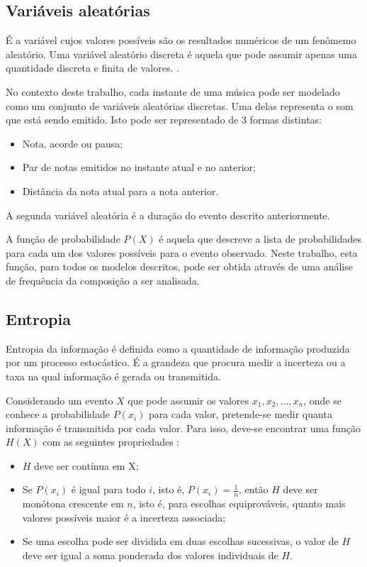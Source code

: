 \subsection{Variáveis aleatórias}
\label{sec:prob}

É a variável cujos valores possíveis são os resultados numéricos de um fenômemo aleatório. Uma variável aleatório discreta é aquela que pode assumir apenas uma quantidade discreta e finita de valores. \cite{estocastico}.

No contexto deste trabalho, cada instante de uma música pode ser modelado como um conjunto de variáveis aleatórias discretas. Uma delas representa o som que está sendo emitido. Isto pode ser representado de 3 formas distintas:

\begin{itemize}
    \item Nota, acorde ou pausa;
    \item Par de notas emitidos no instante atual e no anterior;
    \item Distância da nota atual para a nota anterior.
\end{itemize}

A segunda variável aleatória é a duração do evento descrito anteriormente.

A função de probabilidade $P(X)$ é aquela que descreve a lista de probabilidades para cada um dos valores possíveis para o evento observado. Neste trabalho, esta função, para todos os modelos descritos, pode ser obtida através de uma análise de frequência da composição a ser analisada.

\subsection{Entropia}

Entropia da informação é definida como a quantidade de informação produzida por um processo estocástico. É a grandeza que procura medir a incerteza ou a taxa na qual informação é gerada ou transmitida.

Considerando um evento $X$ que pode assumir os valores ${x_1, x_2, ..., x_n}$, onde se conhece a probabilidade $P(x_i)$ para cada valor, pretende-se medir quanta informação é transmitida por cada valor. Para isso, deve-se encontrar uma função $H(X)$ com as seguintes propriedades \cite{shannon}:

\begin{itemize}
    \item $H$ deve ser contínua em X;
    \item Se $P(x_i)$ é igual para todo $i$, isto é, $P(x_i) = \frac{1}{n}$, então $H$ deve ser monótona crescente em $n$, isto é, para escolhas equiprováveis, quanto mais valores possíveis maior é a incerteza associada;
    \item Se uma escolha pode ser dividida em duas escolhas sucessivas, o valor de $H$ deve ser igual a soma ponderada dos valores individuais de $H$. 
\end{itemize}


